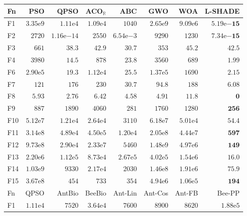 \begin{tabular}{lrrrrrrr}
\toprule
Fn & PSO & QPSO & ACO$_\mathbb{R}$ & ABC & GWO & WOA & L-SHADE \\
\midrule
F1 & $3.35\mathrm{e}{9}$ & $1.11\mathrm{e}{4}$ & $1.09\mathrm{e}{4}$ & $1040$ & $2.65\mathrm{e}{9}$ & $9.09\mathrm{e}{6}$ & $\mathbf{5.19\mathrm{e}{-15}}$ \\
F2 & $2720$ & $1.16\mathrm{e}{-14}$ & $2550$ & $6.54\mathrm{e}{-3}$ & $9290$ & $1230$ & $\mathbf{7.34\mathrm{e}{-15}}$ \\
F3 & $661$ & $38.3$ & $42.9$ & $30.7$ & $353$ & $45.2$ & $42.5$ \\
F4 & $3980$ & $14.5$ & $878$ & $23.8$ & $3560$ & $689$ & $\mathbf{1.99}$ \\
F6 & $2.90\mathrm{e}{5}$ & $19.3$ & $1.12\mathrm{e}{4}$ & $25.5$ & $1.37\mathrm{e}{5}$ & $1690$ & $\mathbf{2.15}$ \\
F7 & $121$ & $176$ & $230$ & $30.7$ & $94.8$ & $188$ & $\mathbf{6.08}$ \\
F8 & $5.93$ & $2.76$ & $6.42$ & $4.58$ & $4.91$ & $11.8$ & $\mathbf{0}$ \\
F9 & $887$ & $1890$ & $4060$ & $281$ & $1760$ & $1280$ & $\mathbf{256}$ \\
F10 & $5.12\mathrm{e}{7}$ & $1.21\mathrm{e}{4}$ & $2.64\mathrm{e}{4}$ & $3110$ & $6.18\mathrm{e}{7}$ & $5.01\mathrm{e}{4}$ & $\mathbf{54.4}$ \\
F11 & $3.14\mathrm{e}{8}$ & $4.89\mathrm{e}{4}$ & $4.50\mathrm{e}{5}$ & $1.20\mathrm{e}{4}$ & $2.05\mathrm{e}{8}$ & $4.44\mathrm{e}{7}$ & $\mathbf{597}$ \\
F12 & $9.73\mathrm{e}{8}$ & $2.90\mathrm{e}{4}$ & $2.33\mathrm{e}{7}$ & $5460$ & $1.48\mathrm{e}{9}$ & $4.97\mathrm{e}{6}$ & $\mathbf{149}$ \\
F13 & $2.20\mathrm{e}{6}$ & $1.12\mathrm{e}{5}$ & $8.73\mathrm{e}{4}$ & $2.67\mathrm{e}{5}$ & $4.02\mathrm{e}{5}$ & $1.54\mathrm{e}{6}$ & $\mathbf{16.0}$ \\
F14 & $1.03\mathrm{e}{9}$ & $9330$ & $2.17\mathrm{e}{4}$ & $2030$ & $1.46\mathrm{e}{8}$ & $1.91\mathrm{e}{6}$ & $\mathbf{75.9}$ \\
F15 & $3.67\mathrm{e}{8}$ & $454$ & $733$ & $354$ & $4.94\mathrm{e}{6}$ & $1.06\mathrm{e}{5}$ & $\mathbf{194}$ \\
\midrule
Fn & QPSO & AntBio & BeeBio & Ant-Lin & Ant-Cos & Ant-FB & Bee-PP \\
\midrule
F1 & $1.11\mathrm{e}{4}$ & $7520$ & $3.64\mathrm{e}{4}$ & $7600$ & $8900$ & $8620$ & $1.88\mathrm{e}{5}$ \\

\end{tabular}
